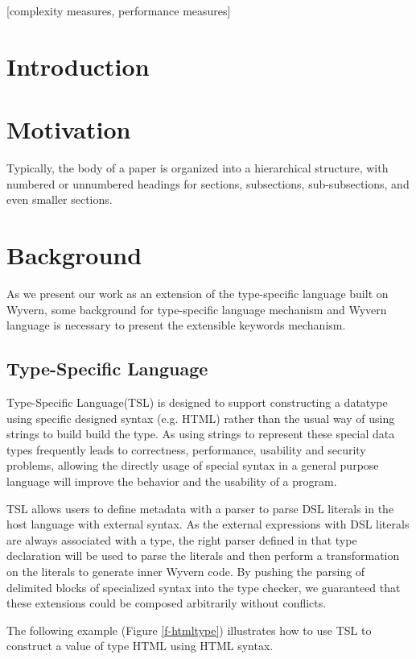 \documentclass{sig-alternate}
\begin{document}
[complexity measures, performance measures]



\section{Introduction}

\section{Motivation}
Typically, the body of a paper is organized
into a hierarchical structure, with numbered or unnumbered
headings for sections, subsections, sub-subsections, and even
smaller sections.

\section{Background}
As we present our work as an extension of the type-specific language built on Wyvern, some background for type-specific language mechanism and Wyvern language is necessary to present the extensible keywords mechanism. 

\subsection{Type-Specific Language}
Type-Specific Language(TSL) is designed to support constructing a datatype using specific designed syntax (e.g. HTML) rather than the usual way of using strings to build build the type. As using strings to represent these special data types frequently leads to correctness, performance, usability and security problems, allowing the directly usage of special syntax in a general purpose language will improve the behavior and the usability of a program.
\par
TSL allows users to define metadata with a parser to parse DSL literals in the host language with external syntax. As the external expressions with DSL literals are always associated with a type, the right parser defined in that type declaration will be used to parse the literals and then perform a transformation on the literals to generate inner Wyvern code. By pushing the parsing of delimited blocks of specialized syntax into the type checker, we guaranteed that these extensions could be composed arbitrarily without conflicts.
\par
The following example (Figure \ref{f-htmltype}) illustrates how to use TSL to construct a value of type HTML using HTML syntax.
\end{document}
